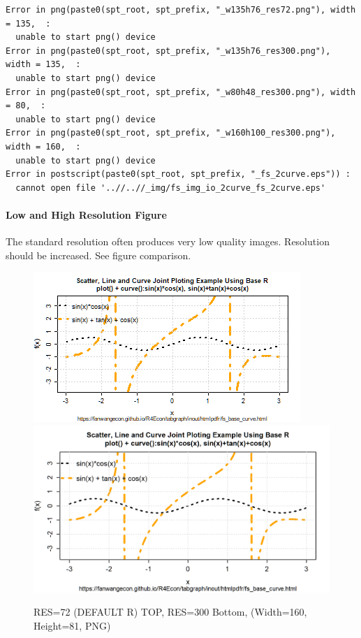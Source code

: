 \documentclass[
]{book}
\begin{document}
\begin{verbatim}
Error in png(paste0(spt_root, spt_prefix, "_w135h76_res72.png"), width = 135,  : 
  unable to start png() device
Error in png(paste0(spt_root, spt_prefix, "_w135h76_res300.png"), width = 135,  : 
  unable to start png() device
Error in png(paste0(spt_root, spt_prefix, "_w80h48_res300.png"), width = 80,  : 
  unable to start png() device
Error in png(paste0(spt_root, spt_prefix, "_w160h100_res300.png"), width = 160,  : 
  unable to start png() device
Error in postscript(paste0(spt_root, spt_prefix, "_fs_2curve.eps")) : 
  cannot open file '..//..//_img/fs_img_io_2curve_fs_2curve.eps'
\end{verbatim}

\hypertarget{low-and-high-resolution-figure}{%
\paragraph{Low and High Resolution Figure}\label{low-and-high-resolution-figure}}

The standard resolution often produces very low quality images. Resolution should be increased. See figure comparison.

\begin{figure}
\centering
\caption{RES=72 (DEFAULT R) TOP, RES=300 Bottom, (Width=160, Height=81, PNG)}
\includegraphics[width=\linewidth]{_img/fs_img_io_2curve_w135h76_res72.png}
\hfill
\centering
\includegraphics[width=\linewidth]{_img/fs_img_io_2curve_w135h76_res300.png}
\end{figure}
\end{document}
